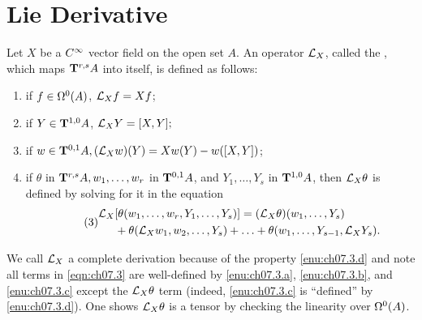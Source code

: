 \documentclass[../main]{subfiles}
\begin{document}
\section{Lie Derivative}\label{ch07:s3}
Let $X$ be a $\CInfty$ vector field on the open set $A$. An operator $\liederiv{X}$, called the , which maps $\tensorbundle{A}{r}{ s}$ into itself, is defined as follows: 
\begin{enumerate}[label=(\alph*)]
    \item\label{enu:ch07.3.a} if $f\in \formbundle{A}{0}$, $\liederiv{X}{f} = Xf$;
    \item\label{enu:ch07.3.b} if $Y\in\tensorbundle{A}{1}{0}$, $\liederiv{X}{Y}=[X, Y];$
    \item\label{enu:ch07.3.c} if $w\in\tensorbundle{A}{0}{1},(\liederiv{X}{w})(Y)=X w(Y)-w([X, Y])$;
    \item\label{enu:ch07.3.d} if $\theta$ in $\tensorbundle{A}{r}{ s}, w_{1}, \ldots, w_{r}$ in $\tensorbundle{A}{0}{1}$, and $Y_{1}, \ldots, Y_{s}$ in $\tensorbundle{A}{1}{ 0}$, then $\liederiv{X} \theta$ is defined by solving for it in the equation
\begin{equation}\tag{3}
\label{eqn:ch07.3}
\begin{split}
\liederiv{X}&{[\theta(w_{1}, \ldots, w_{r}, Y_{1}, \ldots, Y_{s})]} = (\liederiv{X}{\theta})(w_{1}, \ldots, Y_{s}) \\ &+ \theta (\liederiv{X} w_1, w_{2}, \ldots, Y_{s})+\ldots+\theta(w_{1}, \ldots, Y_{s-1}, \liederiv{X} Y_{s}).
\end{split}
\end{equation}

\end{enumerate}
We call $\liederiv{X}$ a complete derivation because of the property \ref{enu:ch07.3.d} and note all terms in \ref{eqn:ch07.3} are well-defined by \ref{enu:ch07.3.a}, \ref{enu:ch07.3.b}, and \ref{enu:ch07.3.c} except the $\liederiv{X} \theta$ term (indeed, \ref{enu:ch07.3.c} is ``defined'' by \ref{enu:ch07.3.d}). One shows $\liederiv{X} \theta$ is a tensor by checking the linearity over $\formbundle{A}{0}$.
\end{document}
